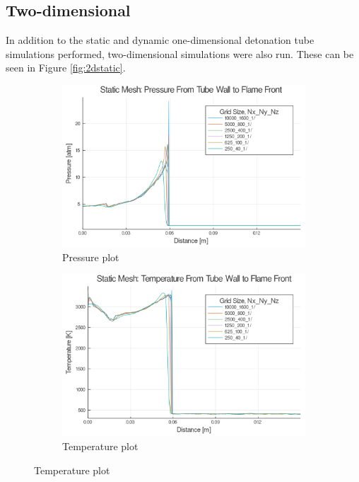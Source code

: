 \subsection{Two-dimensional}
In addition to the static and dynamic one-dimensional detonation tube simulations performed, two-dimensional simulations were also run. These can be seen in Figure \ref{fig:2dstatic}. 
\begin{figure}[]
    \centering
    \begin{subfigure}[]{\textwidth}
        \centering
        \includegraphics[width=\textwidth]{./figs/static2d/p.png}
        \caption{Pressure plot}
        \label{fig:2dstaticp}
    \end{subfigure}

    \begin{subfigure}[]{\textwidth}
        \centering
        \includegraphics[width=\textwidth]{./figs/static2d/t.png}
        \caption{Temperature plot}
    \end{subfigure}

\end{figure}
